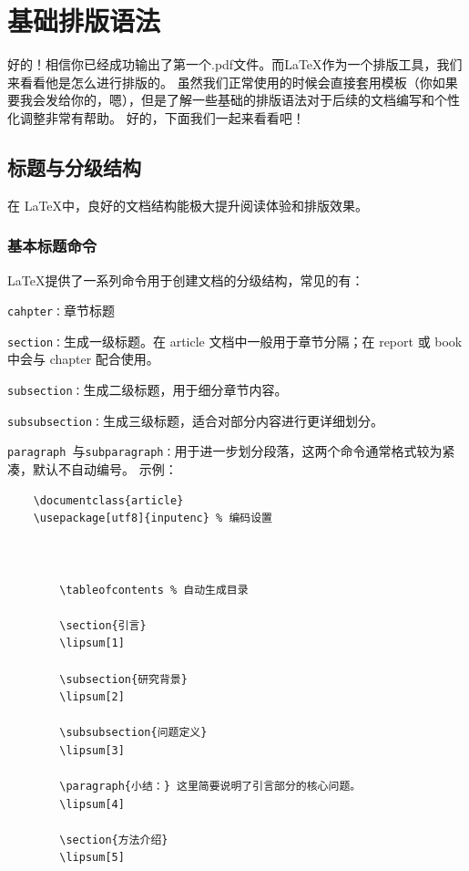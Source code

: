 \chapter{基础排版语法}
好的！相信你已经成功输出了第一个.pdf文件。而\LaTeX 作为一个排版工具，我们来看看他是怎么进行排版的。
虽然我们正常使用的时候会直接套用模板（你如果要我会发给你的，嗯），但是了解一些基础的排版语法对于后续的文档编写和个性化调整非常有帮助。
好的，下面我们一起来看看吧！
\section{标题与分级结构}
在 \LaTeX 中，良好的文档结构能极大提升阅读体验和排版效果。
\subsection{基本标题命令}
\LaTeX 提供了一系列命令用于创建文档的分级结构，常见的有：

\texttt{cahpter{}：}章节标题

\texttt{section{}：}生成一级标题。在 article 文档中一般用于章节分隔；在 report 或 book 中会与 chapter{} 配合使用。

\texttt{subsection{}：}生成二级标题，用于细分章节内容。

\texttt{subsubsection{}：}生成三级标题，适合对部分内容进行更详细划分。

\texttt{paragraph{} }与\texttt{subparagraph{}：}用于进一步划分段落，这两个命令通常格式较为紧凑，默认不自动编号。
示例：
\begin{lstlisting}
	\documentclass{article}
	\usepackage[utf8]{inputenc} % 编码设置
	
	
		
		\tableofcontents % 自动生成目录
		
		\section{引言}
		\lipsum[1]
		
		\subsection{研究背景}
		\lipsum[2]
		
		\subsubsection{问题定义}
		\lipsum[3]
		
		\paragraph{小结：} 这里简要说明了引言部分的核心问题。
		\lipsum[4]
		
		\section{方法介绍}
		\lipsum[5]
		
	 
\end{lstlisting}


